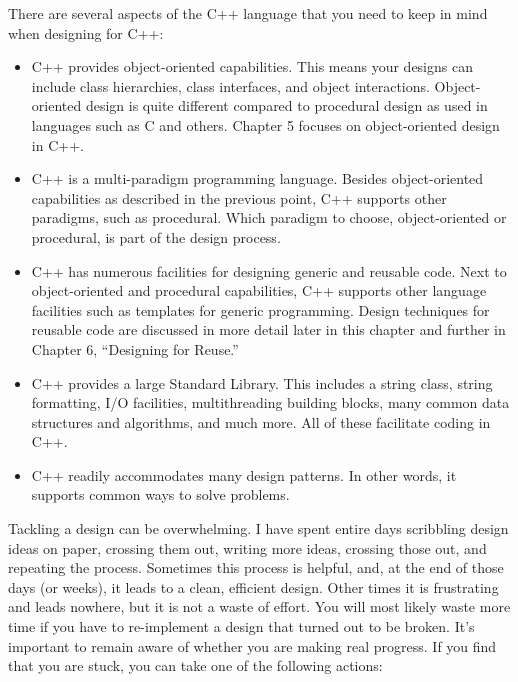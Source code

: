 
There are several aspects of the C++ language that you need to keep in mind when designing for C++:

\begin{itemize}
\item
C++ provides object-oriented capabilities. This means your designs can include class hierarchies, class interfaces, and object interactions. Object-oriented design is quite different compared to procedural design as used in languages such as C and others. Chapter 5 focuses on object-oriented design in C++.

\item
C++ is a multi-paradigm programming language. Besides object-oriented capabilities as described in the previous point, C++ supports other paradigms, such as procedural. Which paradigm to choose, object-oriented or procedural, is part of the design process.

\item
C++ has numerous facilities for designing generic and reusable code. Next to object-oriented and procedural capabilities, C++ supports other language facilities such as templates for generic programming. Design techniques for reusable code are discussed in more detail later in this chapter and further in Chapter 6, “Designing for Reuse.”

\item
C++ provides a large Standard Library. This includes a string class, string formatting, I/O facilities, multithreading building blocks, many common data structures and algorithms, and much more. All of these facilitate coding in C++.

\item
C++ readily accommodates many design patterns. In other words, it supports common ways to solve problems.
\end{itemize}

Tackling a design can be overwhelming. I have spent entire days scribbling design ideas on paper, crossing them out, writing more ideas, crossing those out, and repeating the process. Sometimes this process is helpful, and, at the end of those days (or weeks), it leads to a clean, efficient design. Other times it is frustrating and leads nowhere, but it is not a waste of effort. You will most likely waste more time if you have to re-implement a design that turned out to be broken. It’s important to remain aware of whether you are making real progress. If you find that you are stuck, you can take one of the following actions:

